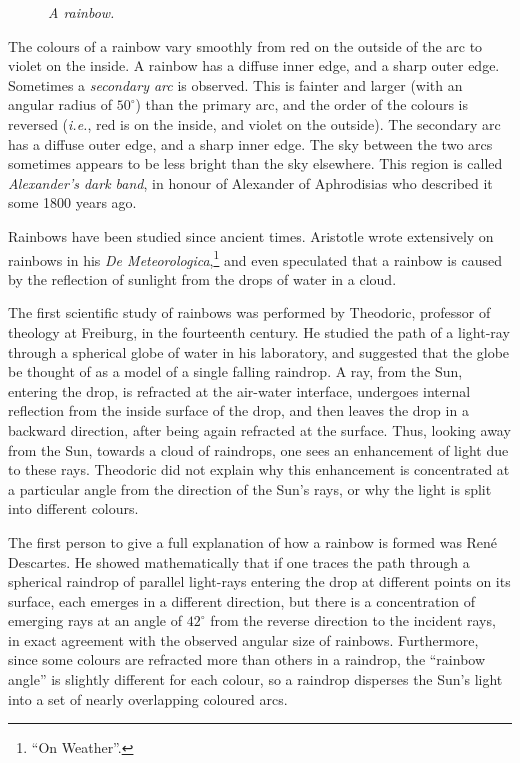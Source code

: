\begin{figure}[h]
\epsfysize=3in
\centerline{}
\caption{\em A rainbow.}\label{f12.13}
\end{figure}

The colours of a rainbow vary smoothly from red on the outside
of the arc to violet on the inside. A rainbow has a
diffuse inner edge, and a sharp outer edge.
Sometimes a {\em secondary arc}\/
is observed. This is fainter and larger
(with an angular radius of $50^\circ$) than the primary
arc, and the order of the colours is reversed ({\em i.e.}, red is
on the inside, and violet on the outside). The secondary
arc has a diffuse outer edge, and a sharp inner edge. The sky between
the two arcs sometimes appears to be less bright than the sky elsewhere.
This region is called {\em Alexander's dark band}, in honour of
Alexander of Aphrodisias who described it some 1800 years ago.

Rainbows have been studied  since ancient times.
Aristotle wrote extensively on rainbows in his 
{\em De Meteorologica},\footnote{``On Weather''.} and even speculated
that a rainbow is caused by the reflection of sunlight from the
drops of water in a cloud. 

The first scientific study of rainbows was performed by Theodoric,
professor of theology at Freiburg, in the fourteenth century.
He studied the path of a light-ray through a spherical globe of water
in his laboratory, and suggested that the globe be thought of as a
model of a single falling raindrop. A ray, from the Sun, entering the drop,
is refracted at the air-water interface, undergoes
 internal reflection from the inside surface of the drop, and
then leaves the drop in a backward direction, after being again
refracted at the surface. Thus, looking away from the
Sun, towards a cloud of raindrops, one sees an enhancement of light due
to these rays. Theodoric did not explain why this enhancement
is concentrated at a particular angle from the direction
of the Sun's rays, or
why the light is split  into different colours.

The first person to give a full  explanation of how a
rainbow is formed was Ren\'{e} Descartes. He showed mathematically
that if one traces the path through a spherical raindrop of
parallel light-rays entering the drop at different points on
its surface, each  emerges in a different direction, but there
is a concentration of emerging rays at an angle of
$42^\circ$ from the reverse  direction to  the incident rays, in exact
agreement with the observed
angular size of rainbows. Furthermore, since some colours are
refracted more than others in a
raindrop, the ``rainbow angle'' is slightly different for each
colour, so a raindrop disperses the Sun's light into a
set of nearly overlapping coloured arcs. 

